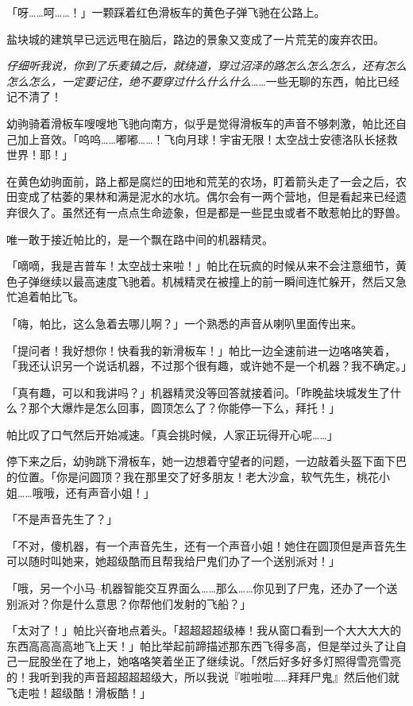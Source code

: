 「呀……呵……！」一颗踩着红色滑板车的黄色子弹飞驰在公路上。

盐块城的建筑早已远远甩在脑后，路边的景象又变成了一片荒芜的废弃农田。

\emph{仔细听我说，你到了乐麦镇之后，就绕道，穿过沼泽的路怎么怎么怎么，还有怎么怎么怎么，一定要记住，绝不要穿过什么什么什么}……一些无聊的东西，帕比已经记不清了！

幼驹骑着滑板车嗖嗖地飞驰向南方，似乎是觉得滑板车的声音不够刺激，帕比还自己加上音效。「呜呜……嘟嘟……！飞向月球！宇宙无限！太空战士安德洛队长拯救世界！耶！」

在黄色幼驹面前，路上都是腐烂的田地和荒芜的农场，盯着箭头走了一会之后，农田变成了枯萎的果林和满是泥水的水坑。偶尔会有一两个营地，但是看起来已经遗弃很久了。虽然还有一点点生命迹象，但是都是一些昆虫或者不敢惹帕比的野兽。

唯一敢于接近帕比的，是一个飘在路中间的机器精灵。

「嘀嘀，我是吉普车！太空战士来啦！」帕比在玩疯的时候从来不会注意细节，黄色子弹继续以最高速度飞驰着。机械精灵在被撞上的前一瞬间连忙躲开，然后又急忙追着帕比飞。

「嗨，帕比，这么急着去哪儿啊？」一个熟悉的声音从喇叭里面传出来。

「提问者！我好想你！快看我的新滑板车！」帕比一边全速前进一边咯咯笑着，「我还认识另一个说话机器，不过那个很有趣，或许她不是一个机器？我不确定。」

「真有趣，可以和我讲吗？」机器精灵没等回答就接着问。「昨晚盐块城发生了什么？那个大爆炸是怎么回事，圆顶怎么了？你能停一下么，拜托！」

帕比叹了口气然后开始减速。「真会挑时候，人家正玩得开心呢……」

停下来之后，幼驹跳下滑板车，她一边想着守望者的问题，一边敲着头盔下面下巴的位置。「你是问圆顶？我在那里交了好多朋友！老大沙盒，软气先生，桃花小姐……哦哦，还有声音小姐！」

「不是声音先生了？」

「不对，傻机器，有一个声音先生，还有一个声音小姐！她住在圆顶但是声音先生可以随时叫她来，她超级酷而且帮我给尸鬼们办了一个送别派对！」

「哦，另一个小马--机器智能交互界面么……那么……你见到了尸鬼，还办了一个送别派对？你是什么意思？你帮他们发射的飞船？」

「太对了！」帕比兴奋地点着头。「超超超超级棒！我从窗口看到一个大大大大的东西高高高高地飞上天！」帕比举起前蹄描述那东西飞得多高，但是举过头了让自己一屁股坐在了地上，她咯咯笑着坐正了继续说。「然后好多好多灯照得雪亮雪亮的！我听到我的声音超超超超级大，所以我说『啦啦啦……拜拜尸鬼』然后他们就飞走啦！超级酷！滑板酷！」

